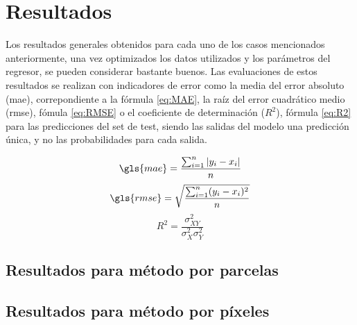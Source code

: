 
\chapter{Resultados}
\label{resultados}
\par Los resultados generales obtenidos para cada uno de los casos mencionados anteriormente, una vez optimizados los datos utilizados y los parámetros del regresor, se pueden considerar bastante buenos. Las evaluaciones de estos resultados se realizan con indicadores de error como la media del error absoluto (\gls{mae}), correpondiente a la fórmula \ref{eq:MAE}, la raíz del error cuadrático medio (\gls{rmse}), fómula \ref{eq:RMSE} o el coeficiente de determinación ($R^2$), fórmula \ref{eq:R2} para las predicciones del set de test, siendo las salidas del modelo una predicción única, y no las probabilidades para cada salida.

\begin{equation}\label{eq:MAE}
\gls{mae} = \frac{\sum_{i=1}^{n} \left | y_i -x_i \right |}{n}
\end{equation} 
\begin{equation}\label{eq:RMSE}
\gls{rmse} = \sqrt{\frac{\sum_{i=1}^{n}(y_i- x_i )^2}{n}}
\end{equation}
\begin{equation}\label{eq:R2}
R^2 = \frac{\sigma^2_{XY}}{\sigma^2_X\sigma^2_Y}
\end{equation}

\section{Resultados para método por parcelas}
\section{Resultados para método por píxeles} 
